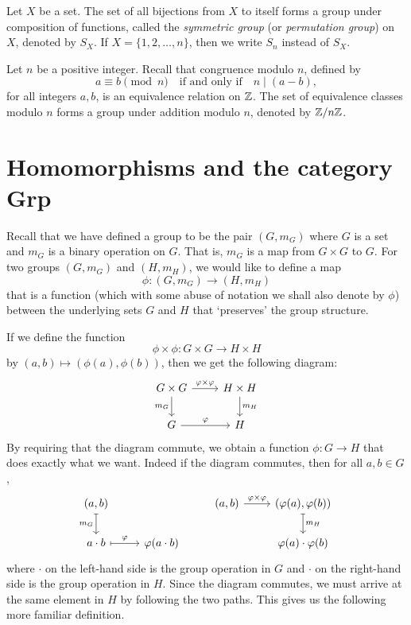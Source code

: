 \begin{definition}
    Let \(X\) be a set. The set of all bijections from \(X\) to itself forms a
    group under composition of functions, called the \emph{symmetric group} (or
    \emph{permutation group}) on \(X\), denoted by \(S_X\). If \(X = \{1, 2,
    \ldots, n\}\), then we write \(S_n\) instead of \(S_X\).
\end{definition}

\begin{definition}
    \label{def:zmodn}
    Let \(n\) be a positive integer. Recall that congruence modulo \(n\),
    defined by
    \[
        a \equiv b \pmod{n} \quad \text{if and only if} \quad n \mid (a - b),
    \]
    for all integers \(a, b\), is an equivalence relation on \(\mathbb{Z}\). The set of
    equivalence classes modulo \(n\) forms a group under addition modulo \(n\),
    denoted by \(\mathbb{Z}/n\mathbb{Z}\).
\end{definition}

\section{Homomorphisms and the category {\normalfont\sffamily Grp}}

\begin{sectionthm}
    Recall that we have defined a group to be the pair \((G, m_G)\) where \(G\)
    is a set and \(m_G\) is a binary operation on \(G\). That is, \(m_G\) is a
    map from \(G \times G\) to \(G\). For two groups \((G, m_G)\) and \((H,
    m_H)\), we would like to define a map
    \[
        \phi: (G, m_G) \to (H, m_H)
    \]
    that is a function (which with some abuse of notation we shall also denote
    by \(\phi\)) between the underlying sets \(G\) and \(H\) that `preserves'
    the group structure.

    If we define the function
    \[
        \phi \times \phi: G \times G \to H \times H
    \]
    by \((a, b) \mapsto (\phi(a), \phi(b))\), then we get the following diagram:
    \[
        \begin{tikzcd}
            G \times G \arrow{r}{\phi \times \phi} \arrow[swap]{d}{m_G} & H \times H \arrow{d}{m_H} \\
            G \arrow{r}{\phi} & H
        \end{tikzcd}
    \]
    By requiring that the diagram commute, we obtain a function \(\phi: G \to
    H\) that does exactly what we want. Indeed if the diagram commutes, then for
    all \(a, b \in G\),
    \[
        \begin{tikzcd}
            (a, b) \arrow[swap, mapsto]{d}{m_G} & & (a, b) \arrow{r}{\phi \times \phi} & (\phi(a), \phi(b)) \arrow[mapsto]{d}{m_H} \\
            a\cdot b \arrow[mapsto]{r}{\phi} & \phi(a\cdot b) && \phi(a)\cdot\phi(b)
        \end{tikzcd}
    \]
    where \(\cdot\) on the left-hand side is the group operation in \(G\) and
    \(\cdot\) on the right-hand side is the group operation in \(H\). Since the
    diagram commutes, we must arrive at the same element in \(H\) by following
    the two paths. This gives us the following more familiar definition.
\end{sectionthm}

